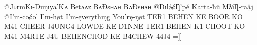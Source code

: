 @JʋrmKı-Duŋıya'Kʌ Betʌʌz BʌÐsʜʌʜ BʌÐsʜʌʜ 
@DīlǿǿȠ'pḗ Kārtā-ħǖ MƛîȠ-rāậj 
@I'm-coǿol I'm-høt I'm-ęverythıŋg You'rę-ŋøt   TER1 BEHEN KE BOOR KO M41 CHEER J4UNG4 LOWDE KE D1NNE TER1 BEHEN K1 CHOOT KO M41 M4RTE J4U BEHENCHOD KE B4CHEW 44J4 =]]
